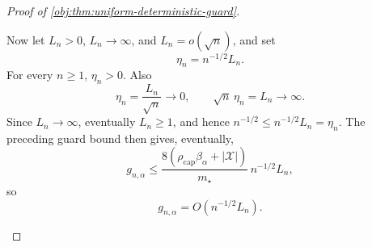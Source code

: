 \begin{proof}[Proof of \cref{obj:thm:uniform-deterministic-guard}]
\begin{enumerate}
Now let \(L_n>0\), \(L_n\to\infty\), and \(L_n=o(\sqrt n)\), and set
\[
\eta_n=n^{-1/2}L_n .
\]
For every \(n\ge1\), \(\eta_n>0\).  Also
\[
\eta_n=\frac{L_n}{\sqrt n}\longrightarrow0,
\qquad
\sqrt n\,\eta_n=L_n\longrightarrow\infty .
\]
Since \(L_n\to\infty\), eventually \(L_n\ge1\), and hence
\(n^{-1/2}\le n^{-1/2}L_n=\eta_n\).  The preceding guard bound then gives,
eventually,
\[
g_{n,\alpha}
\le
\frac{8(\rho_{\mathrm{cap}}\beta_\alpha+|\mathcal X|)}{m_\star}
\,n^{-1/2}L_n,
\]
so
\[
g_{n,\alpha}=O(n^{-1/2}L_n).
\]
\end{enumerate}
\end{proof}
